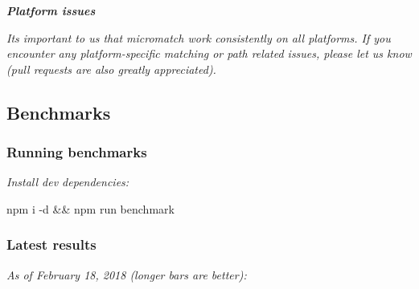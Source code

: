{\itshape {\bfseries Platform issues}}

{\itshape It\textquotesingle{}s important to us that micromatch work consistently on all platforms. If you encounter any platform-\/specific matching or path related issues, please let us know (pull requests are also greatly appreciated).}

{\itshape \subsection*{Benchmarks}}

{\itshape }

{\itshape \subsubsection*{Running benchmarks}}

{\itshape }

{\itshape Install dev dependencies\+:}

{\itshape 
\begin{DoxyCode}
npm i -d && npm run benchmark
\end{DoxyCode}
}

{\itshape \subsubsection*{Latest results}}

{\itshape }

{\itshape As of February 18, 2018 (longer bars are better)\+:}

